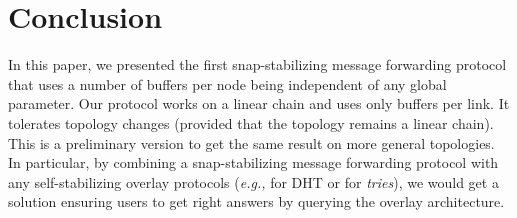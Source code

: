 \documentclass{llncs}
\newcommand{\eg}{\emph{e.g., }}
\begin{document}
\section{Conclusion\label{sec:conclu}}

In this paper, we presented the first snap-stabilizing message forwarding protocol that uses 
a number of buffers per node being independent of any global parameter.  Our protocol works on a linear chain and 
uses only  buffers per link.  
It tolerates topology changes (provided that the topology remains a linear chain). 
This is a preliminary version to get the same result on more general topologies.  
In particular, by combining a snap-stabilizing message forwarding protocol with any self-stabilizing overlay protocols 
(\eg \cite{BBKLPR10} for DHT or \cite{AspnesS2003,CDPT07,CDPT08} for \emph{tries}), we would get a solution
ensuring users to get right answers by querying the overlay architecture.

\begin{scriptsize}


\end{scriptsize}
\end{document}
